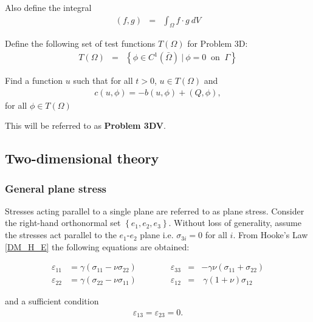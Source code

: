 			Also define the integral
			\begin{eqnarray}
				(f,g) &=& \int_{\Omega} f\cdot g \ dV \label{eq:3D_Model:Bilinear_int}
			\end{eqnarray}

			Define the following set of test functions $T(\Omega)$ for Problem 3D:
			\begin{eqnarray*}
				T(\Omega) & = & \left\{ \phi \in C^1(\bar{\Omega}) \ | \ \phi = 0 \ \textrm{ on } \ \Gamma \right\}
			\end{eqnarray*}\label{sym:TOmega}

			Find a function $u$ such that for all $t>0$, $u \in T(\Omega)$ and
			\begin{align}
				c(u,\phi) = -b(u,\phi) + (Q,\phi), \label{eq:3D_Model:Problem3D1VEq}
			\end{align}
			for all $\phi \in T(\Omega)$

			This will be referred to as \textbf{Problem 3DV}.

	\subsection{Two-dimensional theory}
		\subsubsection*{General plane stress}
			Stresses acting parallel to a single plane are referred to as plane stress. 
			Consider the right-hand orthonormal set $\left\{e_1, e_2, e_3\right\}$. Without
			loss of generality, assume the stresses act parallel to the $e_1$-$e_2$ plane
			i.e. $\sigma_{3i} = 0$ for all $i$. From Hooke's Law \eqref{DM_H_E} the
			following equations are obtained: \label{sym:e_i}

			\begin{equation}
				\begin{aligned}
					\varepsilon_{11} & =  \gamma  ( \sigma_{11} - \nu \sigma_{22}) \qquad \qquad \varepsilon_{33} & = & - \gamma \nu (\sigma_{11} + \sigma_{22})          \\
					\varepsilon_{22} & =   \gamma (\sigma_{22} - \nu\sigma_{11}) \qquad \qquad \varepsilon_{12}   & = & \  \gamma (1+\nu) \sigma_{12} \label{strain_comp}
				\end{aligned}
			\end{equation}

			and a sufficient condition
			\begin{eqnarray}
				\varepsilon_{13} =  \varepsilon_{23} = 0.
			\end{eqnarray}


